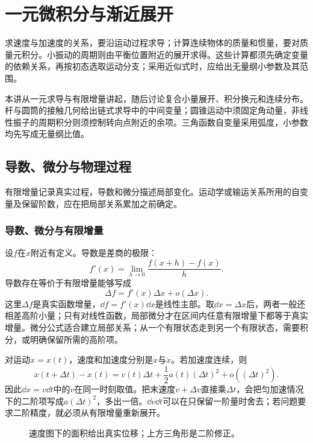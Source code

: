 \chapter{一元微积分与渐近展开}\label{ch:c1}

求速度与加速度的关系，要沿运动过程求导；计算连续物体的质量和惯量，要对质量元积分。小振动的周期则由平衡位置附近的展开求得。这些计算都须先确定变量的依赖关系，再按初态选取运动分支；采用近似式时，应给出无量纲小参数及其范围。

本讲从一元求导与有限增量讲起，随后讨论复合小量展开、积分换元和连续分布。杆与圆筒的接触几何给出链式求导中的中间变量；圆锥运动中须固定角动量，非线性振子的周期积分则须控制转向点附近的余项。三角函数自变量采用弧度，小参数均先写成无量纲比值。


\section{导数、微分与物理过程}\label{sec:c1-foundation}
有限增量记录真实过程，导数和微分描述局部变化。运动学或输运关系所用的自变量及保留阶数，应在把局部关系累加之前确定。

\subsection{导数、微分与有限增量}
设$f$在$x$附近有定义。导数是差商的极限：
\begin{equation}\label{eq:c1-derivative}
 f'(x)=\lim_{h\to0}\frac{f(x+h)-f(x)}h.
\end{equation}
导数存在等价于有限增量能够写成
\begin{equation}\Delta f=f'(x)\Delta x+o(\Delta x).
\end{equation}
这里$\Delta f$是真实函数增量，$\dd f=f'(x)\dd x$是线性主部。取$\dd x=\Delta x$后，两者一般还相差高阶小量；只有对线性函数，局部微分才在区间内任意有限增量下都等于真实增量。微分公式适合建立局部关系；从一个有限状态走到另一个有限状态，需要积分，或明确保留所需的高阶项。

对运动$x=x(t)$，速度和加速度分别是$\dot x$与$\ddot x$。若加速度连续，则
\begin{equation}\label{eq:c1-displacement}
 x(t+\Delta t)-x(t)=v(t)\Delta t+\frac12a(t)(\Delta t)^2+o((\Delta t)^2).
\end{equation}
因此$\dd x=v\dd t$中的$v$在同一时刻取值。把末速度$v+\Delta v$直接乘$\Delta t$，会把匀加速情况下的二阶项写成$a(\Delta t)^2$，多出一倍。$\dd v\dd t$可以在只保留一阶量时舍去；若问题要求二阶精度，就必须从有限增量重新展开。

\begin{figure}[H]\centering
{}
\caption{速度图下的面积给出真实位移；上方三角形是二阶修正。}\label{fig:c1-differential}
\end{figure}
